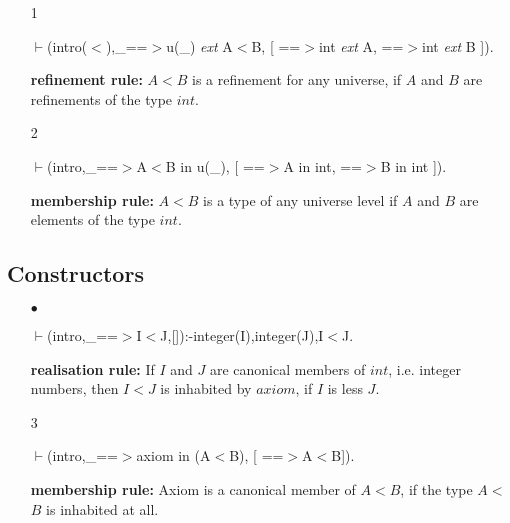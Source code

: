 \documentclass[11pt]{report}
\begin{document}
 \begin{enumerate}
 \item[1]
\begin{sf}\begin{tabbing}
$\vdash$(intro($<$),\_\hspace{0.1em}==$>$u(\_\hspace{0.1em}) \mbox{\it ext} A$<$B, [ ==$>$int \mbox{\it ext} A, ==$>$int \mbox{\it ext} B ]).
\end{tabbing}\end{sf}

 {\bf refinement rule:} $A<B$ is a refinement for any universe,
 if $A$ and $B$ are refinements of the type $int$.
  
 \item[2]
\begin{sf}\begin{tabbing}
$\vdash$(intro,\_\hspace{0.1em}==$>$A$<$B in u(\_\hspace{0.1em}), [ ==$>$A in int, ==$>$B in int ]).
\end{tabbing}\end{sf}

 {\bf membership rule:} $A<B$ is a type of any universe level
 if $A$ and $B$ are elements of the type $int$.
  
 \end{enumerate}
 
 \subsection{Constructors}
  
 \begin{enumerate}
 \item[$\bullet$]
\begin{sf}\begin{tabbing}
$\vdash$(intro,\_\hspace{0.1em}==$>$I$<$J,[]):-integer(I),integer(J),I$<$J.
\end{tabbing}\end{sf}

 {\bf realisation rule:}
 If $I$ and $J$ are canonical members of $int$, i.e. integer
 numbers, then $I$$<J$ is inhabited by $axiom$, if $I$ is less $J$.
  
 \item[3]
\begin{sf}\begin{tabbing}
$\vdash$(intro,\_\hspace{0.1em}==$>$axiom in (A$<$B), [ ==$>$A$<$B]).
\end{tabbing}\end{sf}

 {\bf membership rule:}
 Axiom is a canonical member of $A$$<$$B$, if the type $A$$<$$B$
 is inhabited at all.
  
 \end{enumerate}
  
\end{document}
